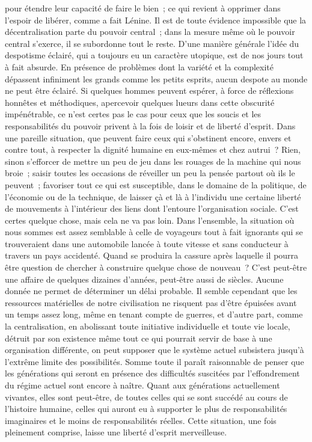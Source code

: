 \documentclass[french,twoside]{book} %
\begin{document}
pour étendre leur capacité de faire le bien ; ce qui revient à opprimer dans l'espoir de libérer, comme a fait Lénine. Il est de toute évidence impossible que la décentralisation parte du pouvoir central ; dans la mesure même où le pouvoir central s'exerce, il se subordonne tout le reste. D'une manière générale l'idée du despotisme éclairé, qui a toujours eu un caractère utopique, est de nos jours tout à fait absurde. En présence de problèmes dont la variété et la complexité dépassent infiniment les grands comme les petits esprits, aucun despote au monde ne peut être éclairé. Si quelques hommes peuvent espérer, à force de réflexions honnêtes et méthodiques, apercevoir quelques lueurs dans cette obscurité impénétrable, ce n'est certes pas le cas pour ceux que les soucis et les responsabilités du pouvoir privent à la fois de loisir et de liberté d'esprit. Dans une pareille situation, que peuvent faire ceux qui s'obstinent encore, envers et contre tout, à respecter la dignité humaine en eux-mêmes et chez autrui ? Rien, sinon s'efforcer de mettre un peu de jeu dans les rouages de la machine qui nous broie ; saisir toutes les occasions de réveiller un peu la pensée partout où ils le peuvent ; favoriser tout ce qui est susceptible, dans le domaine de la politique, de l'économie ou de la technique, de laisser çà et là à l'individu une certaine liberté de mouvements à l'intérieur des liens dont l'entoure l'organisation sociale. C'est certes quelque chose, mais cela ne va pas loin. Dans l'ensemble, la situation où nous sommes est assez semblable à celle de voyageurs tout à fait ignorants qui se trouveraient dans une automobile lancée à toute vitesse et sans conducteur à travers un pays accidenté. Quand se produira la cassure après laquelle il pourra être question de chercher à construire quelque chose de nouveau ? C'est peut-être une affaire de quelques dizaines d'années, peut-être aussi de siècles. Aucune donnée ne permet de déterminer un délai probable. Il semble cependant que les ressources matérielles de notre civilisation ne risquent pas d'être épuisées avant un temps assez long, même en tenant compte de guerres, et d'autre part, comme la centralisation, en abolissant toute initiative individuelle et toute vie locale, détruit par son existence même tout ce qui pourrait servir de base à une organisation différente, on peut supposer que le système actuel subsistera jusqu'à l'extrême limite des possibilités. Somme toute il paraît raisonnable de penser que les générations qui seront en présence des difficultés suscitées par l'effondrement du régime actuel sont encore à naître. Quant aux générations actuellement vivantes, elles sont peut-être, de toutes celles qui se sont succédé au cours de l'histoire humaine, celles qui auront eu à supporter le plus de responsabilités imaginaires et le moins de responsabilités réelles. Cette situation, une fois pleinement comprise, laisse une liberté d'esprit merveilleuse.\par
\end{document}
